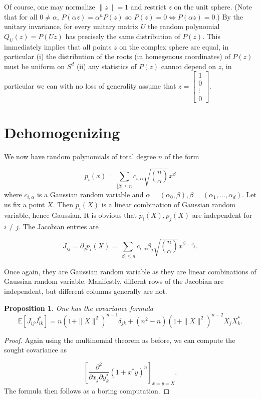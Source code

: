 \documentclass[12pt]{article}
\def\E{\mathbb{E}}
\newtheorem{proposition}{Proposition}[section]
\begin{document}
Of course, one may normalize $\|z\|=1$ and restrict $z$ on the unit sphere. (Note that for all $0 \neq \alpha$, $P(\alpha z)=\alpha^n P(z)$ so $P(z)=0 \Leftrightarrow P(\alpha z)=0$.) By the unitary invariance, for every unitary matrix $U$ the random polynomial $Q_U(z)=P(Uz)$ has precisely the same distribution of $P(z)$. This immediately implies that all points $z$ on the complex sphere are equal, in particular (i) the distribution of the roots (in homegenous coordinates) of $P(z)$ must be uniform on $S^d$ (ii) any statistics of $P(z)$ cannot depend on $z$, in particular we can with no loss of generality assume that $z=\begin{bmatrix}
1\\
0\\
\vdots\\
0
\end{bmatrix}$. 
\section*{Dehomogenizing}

We now have random polynomials of total degree $n$ of the form

\begin{equation}
p_i(x) = \sum_{|\beta| \leq n} c_{i,\alpha} \sqrt{\binom{n}{\alpha}} x^\beta
\end{equation}
where $c_{i,\alpha}$ is a Gaussian random variable and $\alpha=(\alpha_0,\beta), \beta=(\alpha_1,\dots,\alpha_d)$. Let us fix a point $X$. Then $p_i(X)$ is a linear combination of Gaussian random variable, hence Gaussian. It is obvious that $p_i(X),p_j(X)$ are independent for $i \neq j$. The Jacobian entries are

\[  J_{ij} =\partial_j p_i(X) = \sum_{|\beta| \leq n} c_{i,\alpha} \beta_j \sqrt{\binom{n}{\alpha}} x^{\beta-e_j}. \] 

Once again, they are Gaussian random variable as they are linear combinations of Gaussian random variable. Manifestly, differnt rows of the Jacobian are independent, but different columns generally are not.


\begin{proposition}
One has the covariance formula
\[  \E[J_{ij} J_{ik}^*] = n (1 + \| X \|^2)^{n-1} \delta_{jk} + (n^2-n) (1+\| X \|^2)^{n-2} X_j X_k^*.   \]
\end{proposition}

\begin{proof}
Again using the multinomial theorem as before, we can compute the sought covariance as

\[ \left[ \frac{\partial^2}{\partial x_j \partial y_k^*}(1+x^* y)^n    \right]_{x=y=X}. \]
The formula then follows as a boring computation.
\end{proof}
\end{document}
